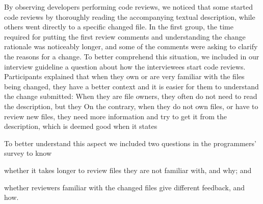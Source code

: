 By observing developers performing code reviews, we noticed that some started code reviews by thoroughly reading the accompanying textual description, while others went directly to a specific changed file. In the first group, the time required for putting the first review comments and understanding the change rationale was noticeably longer, and some of the comments were asking to clarify the reasons for a change. To better comprehend this situation, we included in our interview guideline a question about how the interviewees start code reviews. Participants explained that when they own or are very familiar with the files being changed, they have a better context and it is easier for them to understand the change submitted:  When they are file owners, they often do not need to read the description, but they  On the contrary, when they do not own files, or have to review new files, they need more information and try to get it from the description, which is deemed good when it states 

To better understand this aspect we included two questions in the programmers' survey to know \begin{inparaenum}[(1)]
\item whether it takes longer to review files they are not familiar with, and why; and 
\item whether reviewers familiar with the changed files give different feedback, and how. \end{inparaenum}

